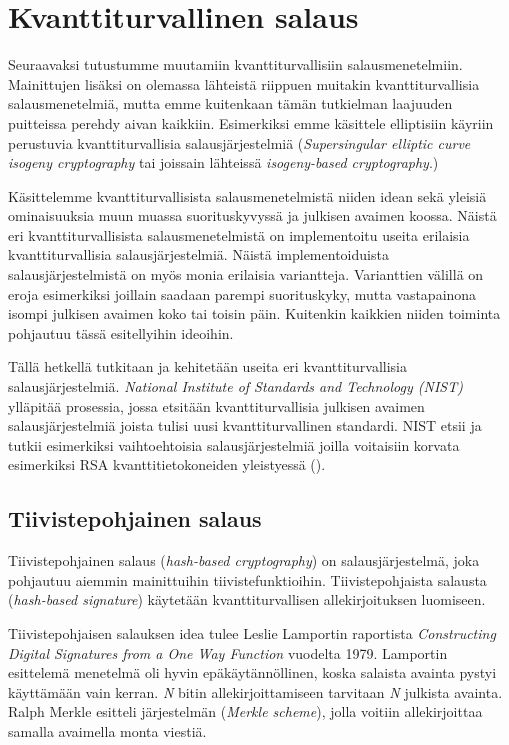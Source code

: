\chapter{Kvanttiturvallinen salaus\label{results}}

Seuraavaksi tutustumme muutamiin kvanttiturvallisiin salausmenetelmiin. Mainittujen lisäksi on olemassa lähteistä riippuen muitakin kvanttiturvallisia salausmenetelmiä, mutta emme kuitenkaan tämän tutkielman laajuuden puitteissa perehdy aivan kaikkiin. Esimerkiksi emme käsittele elliptisiin käyriin perustuvia kvanttiturvallisia salausjärjestelmiä (\emph{Supersingular elliptic curve isogeny cryptography} tai joissain lähteissä \emph{isogeny-based cryptography}.)


Käsittelemme kvanttiturvallisista salausmenetelmistä niiden idean sekä yleisiä ominaisuuksia muun muassa suorituskyvyssä ja julkisen avaimen koossa. Näistä eri kvanttiturvallisista salausmenetelmistä on implementoitu useita erilaisia kvanttiturvallisia salausjärjestelmiä. Näistä implementoiduista salausjärjestelmistä on myös monia erilaisia variantteja. Varianttien välillä on eroja esimerkiksi joillain saadaan parempi suorituskyky, mutta vastapainona isompi julkisen avaimen koko tai toisin päin. Kuitenkin kaikkien niiden toiminta pohjautuu tässä esitellyihin ideoihin.

Tällä hetkellä tutkitaan ja kehitetään useita eri kvanttiturvallisia salausjärjestelmiä. \emph{National Institute of Standards and Technology (NIST)} ylläpitää prosessia, jossa etsitään kvanttiturvallisia julkisen avaimen salausjärjestelmiä joista tulisi uusi kvanttiturvallinen standardi. NIST etsii ja tutkii esimerkiksi vaihtoehtoisia salausjärjestelmiä joilla voitaisiin korvata esimerkiksi RSA kvanttitietokoneiden yleistyessä (\cite{alagic2020status}).

\section{Tiivistepohjainen salaus}
Tiivistepohjainen salaus (\emph{hash-based cryptography}) on salausjärjestelmä, joka pohjautuu aiemmin mainittuihin tiivistefunktioihin. Tiivistepohjaista salausta (\emph{hash-based signature}) käytetään kvanttiturvallisen allekirjoituksen luomiseen.

Tiivistepohjaisen salauksen idea tulee Leslie Lamportin raportista \emph{Constructing Digital Signatures from a One Way Function} vuodelta 1979. Lamportin esittelemä menetelmä oli hyvin epäkäytännöllinen, koska salaista avainta pystyi käyttämään vain kerran. \emph{N} bitin allekirjoittamiseen tarvitaan \emph{N} julkista avainta. Ralph Merkle esitteli järjestelmän (\emph{Merkle scheme}), jolla voitiin allekirjoittaa samalla avaimella monta viestiä.

